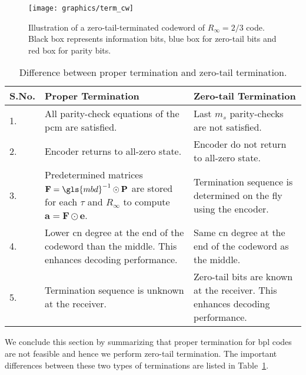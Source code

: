 \begin{figure}[htbp]
  \centering
  \texttt{[image: graphics/term\_cw]}
  \caption{Illustration of a zero-tail-terminated codeword of $R_\infty=2/3$ code. Black box represents information bits, blue box for zero-tail bits and red box for parity bits.}
  \label{fig:term_cw}
\end{figure}

\begin{table}[htbp]
  \centering
  \begin{tabular}{|l|p{7cm}|p{7cm}|}
    \hline
    \textbf{S.No.} &\textbf{Proper Termination} &\textbf{Zero-tail Termination}\\
    \hline
    \hline
    1. &All parity-check equations of the \gls{pcm} are satisfied. &Last $m_s$ parity-checks are not satisfied.\\
    \hline
    2. &Encoder returns to all-zero state. &Encoder do not return to all-zero state.\\
    \hline
    3. &Predetermined matrices $\mathbf{F}=\gls{mbd}^{-1}\odot\mathbf{P}$ are stored for each $\tau$ and $R_\infty$ to compute $\mathbf{a}=\mathbf{F}\odot\mathbf{e}$. &Termination sequence is determined on the fly using the encoder.\\
    \hline
    4. &Lower \gls{cn} degree at the end of the codeword than the middle. This enhances decoding performance. &Same \gls{cn} degree at the end of the codeword as the middle.\\
    \hline
    5. &Termination sequence is unknown at the receiver. &Zero-tail bits are known at the receiver. This enhances decoding performance.\\
    \hline
  \end{tabular}
  \caption{Difference between proper termination and zero-tail termination.}
  \label{tab:diff_term}
\end{table}

We conclude this section by summarizing that proper termination for \gls{bpl} codes are not feasible and hence we perform zero-tail termination. The important differences between these two types of terminations are listed in Table~\ref{tab:diff_term}.